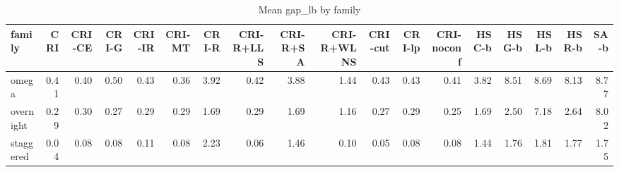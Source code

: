 \begin{table}[htbp]
\centering
\small
\caption{Mean gap\_lb by family}
\label{tab:E5_ablation_b10_by_family}
\begin{tabular}{lrrrrrrrrrrrrrrrrr}
\toprule
family & CRI & CRI-CE & CRI-G & CRI-IR & CRI-MT & CRI-R & CRI-R+LLS & CRI-R+SA & CRI-R+WLNS & CRI-cut & CRI-lp & CRI-noconf & HSC-b & HSG-b & HSL-b & HSR-b & SA-b \\
\midrule
omega & 0.41 & 0.40 & 0.50 & 0.43 & 0.36 & 3.92 & 0.42 & 3.88 & 1.44 & 0.43 & 0.43 & 0.41 & 3.82 & 8.51 & 8.69 & 8.13 & 8.77 \\
overnight & 0.29 & 0.30 & 0.27 & 0.29 & 0.29 & 1.69 & 0.29 & 1.69 & 1.16 & 0.27 & 0.29 & 0.25 & 1.69 & 2.50 & 7.18 & 2.64 & 8.02 \\
staggered & 0.04 & 0.08 & 0.08 & 0.11 & 0.08 & 2.23 & 0.06 & 1.46 & 0.10 & 0.05 & 0.08 & 0.08 & 1.44 & 1.76 & 1.81 & 1.77 & 1.75 \\
\bottomrule
\end{tabular}
\end{table}
